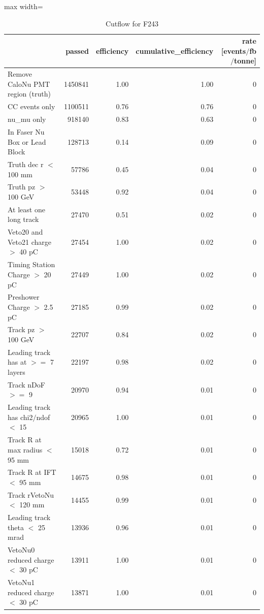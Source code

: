 \documentclass{article}
\begin{document}
\begin{table}
\centering
\caption{Cutflow for F243}
\begin{adjustbox}{max width=\textwidth}
\begin{tabular}{lrrrr}
\toprule
 & passed & efficiency & cumulative\_efficiency & rate [events$/$fb$/$tonne] \\
\midrule
Remove CaloNu PMT region (truth) & 1450841 & 1.00 & 1.00 & 0 \\
CC events only & 1100511 & 0.76 & 0.76 & 0 \\
nu\_mu only & 918140 & 0.83 & 0.63 & 0 \\
In Faser Nu Box or Lead Block & 128713 & 0.14 & 0.09 & 0 \\
Truth dec r $<$ 100 mm & 57786 & 0.45 & 0.04 & 0 \\
Truth pz $>$ 100 GeV & 53448 & 0.92 & 0.04 & 0 \\
At least one long track & 27470 & 0.51 & 0.02 & 0 \\
Veto20 and Veto21 charge $>$ 40 pC & 27454 & 1.00 & 0.02 & 0 \\
Timing Station Charge $>$ 20 pC & 27449 & 1.00 & 0.02 & 0 \\
Preshower Charge $>$ 2.5 pC & 27185 & 0.99 & 0.02 & 0 \\
Track pz $>$ 100 GeV & 22707 & 0.84 & 0.02 & 0 \\
Leading track has at $>$$=$ 7 layers & 22197 & 0.98 & 0.02 & 0 \\
Track nDoF $>$$=$ 9 & 20970 & 0.94 & 0.01 & 0 \\
Leading track has chi2$/$ndof $<$ 15 & 20965 & 1.00 & 0.01 & 0 \\
Track R at max radius $<$ 95 mm & 15018 & 0.72 & 0.01 & 0 \\
Track R at IFT $<$ 95 mm & 14675 & 0.98 & 0.01 & 0 \\
Track rVetoNu $<$ 120 mm & 14455 & 0.99 & 0.01 & 0 \\
Leading track theta $<$ 25 mrad & 13936 & 0.96 & 0.01 & 0 \\
VetoNu0 reduced charge $<$ 30 pC & 13911 & 1.00 & 0.01 & 0 \\
VetoNu1 reduced charge $<$ 30 pC & 13871 & 1.00 & 0.01 & 0 \\
\bottomrule
\end{tabular}

\end{adjustbox}
\end{table}
\end{document}
